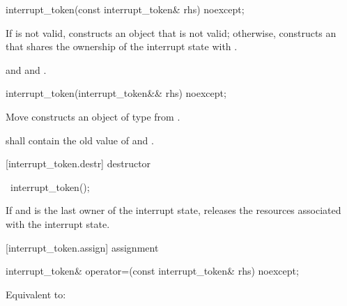 {%

%
\begin{itemdecl}
interrupt_token(const interrupt_token& rhs) noexcept;
\end{itemdecl}
\begin{itemdescr}
  \pnum\effects If  is not valid, constructs an  object
                that is not valid;
                otherwise, constructs an 
                that shares the ownership of the interrupt state with .

  \pnum\postconditions {}
                and 
                and .
\end{itemdescr}

%
\begin{itemdecl}
interrupt_token(interrupt_token&& rhs) noexcept;
\end{itemdecl}
\begin{itemdescr}
  \pnum\effects Move constructs an object of type  from .

  \pnum\postconditions {} shall contain the old value of  and
                        .
\end{itemdescr}

[interrupt_token.destr]{ destructor}

%
\begin{itemdecl}
~interrupt_token();
\end{itemdecl}

\begin{itemdescr}
 \pnum\effects If  and  is the last owner of the interrupt state,
                releases the resources associated with the interrupt state.
\end{itemdescr}

[interrupt_token.assign]{ assignment}

%
\begin{itemdecl}
interrupt_token& operator=(const interrupt_token& rhs) noexcept;
\end{itemdecl}
\begin{itemdescr}
  \pnum\effects Equivalent to: 


\end{itemdescr}}
